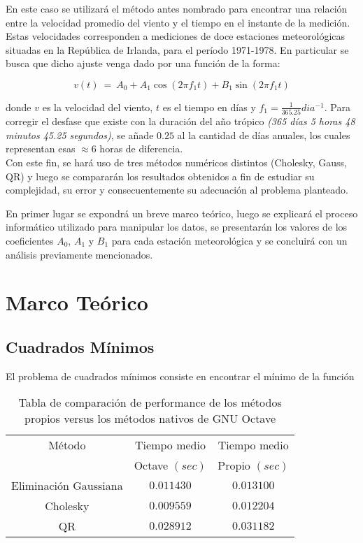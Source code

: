 \documentclass[%
	final,
	reprint,
	notitlepage,
	narroweqnarray,
	inline,
	twoside,
	invited
	]{ieee}
\begin{document}
En este caso se utilizará el método antes nombrado para encontrar una relación entre la velocidad promedio del viento y el tiempo en el instante de la medición. Estas velocidades corresponden a mediciones de doce estaciones meteorológicas situadas en la República de Irlanda, para el período 1971-1978.
En particular se busca que dicho ajuste venga dado por una función de la forma:

\begin{equation}
v(t)\ =\ A_0 + A_1\cos{(2\pi f_{1} t)} + B_1\sin{(2\pi f_{1} t)}
\end{equation}

donde $v$ es la velocidad del viento, $t$ es el tiempo en días y $f_1=\frac{1}{365.25}dia^{-1}$. Para corregir el desfase que existe con la duración del año trópico  \textit{(365 días 5 horas 48 minutos 45.25 segundos)}, se añade $0.25$ al la cantidad de días anuales, los cuales representan esas $\approx 6$ horas de diferencia.\\

Con este fin, se hará uso de tres métodos numéricos distintos (Cholesky, Gauss, QR) y luego se compararán los resultados obtenidos a fin de estudiar su complejidad, su error y consecuentemente su adecuación al problema planteado.

En primer lugar se expondrá un breve marco teórico, luego se explicará el proceso informático utilizado para manipular los datos, se presentarán los valores de los coeficientes $A_0$, $A_1$ y $B_1$ para cada estación meteorológica y se concluirá con un análisis previamente mencionados.



\section{Marco Teórico}
\label{mat}
\subsection{Cuadrados Mínimos}

\par El problema de cuadrados mínimos consiste en encontrar el mínimo de la función

\begin{table}[H]
\begin{center}
\begin{tabular}{|c|c|c|}
\hline
Método & Tiempo medio & Tiempo  medio \\
 &  Octave $(sec)$ & Propio $(sec)$ \\
\hline
\hline
Eliminación Gaussiana & $0.011430$ & $0.013100$ \\
Cholesky & $0.009559$ & $0.012204$ \\
 QR &  $0.028912$&$0.031182$ \\
\hline  
\end{tabular}
\end{center}
\caption{Tabla de comparación de performance de los métodos propios versus los métodos nativos de GNU Octave}
\label{tmedio}
\end{table}
\end{document}
